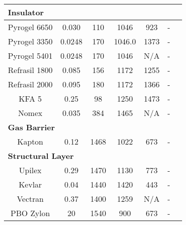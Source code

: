 \begin{table}[ht]
\begin{tabular}{|c|c|c|c|c|c|c|}
		\multicolumn{6}{|l|}{\textbf{Insulator}}			\\ \hline
		Pyrogel\textsuperscript{\textregistered} 6650      & 0.030                                                 & 110                                        & 1046                                            & 923    & - \\ \hline
		Pyrogel\textsuperscript{\textregistered} 3350      & 0.0248                                                & 170                                        & 1046.0                                         & 1373  	 & - \\ \hline
		Pyrogel\textsuperscript{\textregistered} 5401      & 0.0248                                                & 170                                        & 1046                                            & N/A  	 & - \\ \hline
		Refrasil 1800      & 0.085                                                 & 156                                        & 1172                                            & 1255 	 & - \\ \hline
		Refrasil 2000      & 0.095                                                 & 180                                        & 1172                                            & 1366 	 & - \\ \hline
		KFA 5             & 0.25                                                  & 98                                         & 1250                                            & 1473 	 & - \\ \hline
		Nomex             & 0.035                                                  & 384                                         & 1465                                            & N/A 	 & - \\ \hline
		\multicolumn{6}{|l|}{\textbf{Gas Barrier}}			\\ \hline
		Kapton            & 0.12                                                  & 1468                                       & 1022                                            & 673	 & - \\ \hline
		\multicolumn{6}{|l|}{\textbf{Structural Layer}}			\\ \hline
		Upilex            & 0.29                                                  & 1470                                       & 1130                                            & 773 	 & - \\ \hline
		Kevlar            & 0.04 & 1440                                       & 1420                                            & 443 	 & - \\ \hline
		Vectran            & 0.37 & 1400 & 1259 & N/A 	 & -\\ \hline
		PBO Zylon\textsuperscript{\textregistered}			& 20			& 1540	& 900	& 673	& -\\ \hline
	\end{tabular}
	\label{tab:tpsmatprop2}
\end{table}